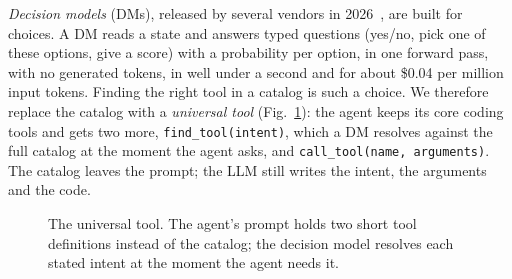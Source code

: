\documentclass[conference]{IEEEtran}
\begin{document}
\emph{Decision models} (DMs), released by several vendors in 2026~\cite{typesafejev,msd1,openrouterdecisions},
are built for choices. A DM reads a state and answers typed questions (yes/no, pick one of these options, give
a score) with a probability per option, in one forward pass, with no generated tokens, in well under a second
and for about \$0.04 per million input tokens. Finding the right tool in a catalog is such a choice. We
therefore replace the catalog with a \emph{universal tool} (Fig.~\ref{fig:universal}): the agent keeps its core
coding tools and gets two more, \texttt{find\_tool(intent)}, which a DM resolves against the full catalog at the
moment the agent asks, and \texttt{call\_tool(name, arguments)}. The catalog leaves the prompt; the LLM still
writes the intent, the arguments and the code.

\begin{figure}[t]
\centering
{}
\caption{The universal tool. The agent's prompt holds two short tool definitions instead of the catalog; the
decision model resolves each stated intent at the moment the agent needs it.}
\label{fig:universal}
\end{figure}
\end{document}
